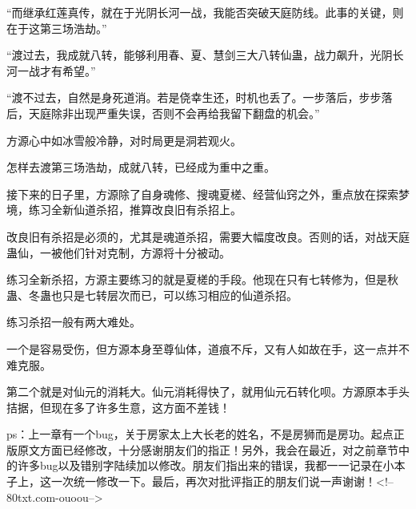 \begin{this_body}
“而继承红莲真传，就在于光阴长河一战，我能否突破天庭防线。此事的关键，则在于这第三场浩劫。”

“渡过去，我成就八转，能够利用春、夏、慧剑三大八转仙蛊，战力飙升，光阴长河一战才有希望。”

“渡不过去，自然是身死道消。若是侥幸生还，时机也丢了。一步落后，步步落后，天庭除非出现严重失误，否则不会再给我留下翻盘的机会。”

方源心中如冰雪般冷静，对时局更是洞若观火。

怎样去渡第三场浩劫，成就八转，已经成为重中之重。

接下来的日子里，方源除了自身魂修、搜魂夏槎、经营仙窍之外，重点放在探索梦境，练习全新仙道杀招，推算改良旧有杀招上。

改良旧有杀招是必须的，尤其是魂道杀招，需要大幅度改良。否则的话，对战天庭蛊仙，一被他们针对克制，方源将十分被动。

练习全新杀招，方源主要练习的就是夏槎的手段。他现在只有七转修为，但是秋蛊、冬蛊也只是七转层次而已，可以练习相应的仙道杀招。

练习杀招一般有两大难处。

一个是容易受伤，但方源本身至尊仙体，道痕不斥，又有人如故在手，这一点并不难克服。

第二个就是对仙元的消耗大。仙元消耗得快了，就用仙元石转化呗。方源原本手头拮据，但现在多了许多生意，这方面不差钱！

ps：上一章有一个bug，关于房家太上大长老的姓名，不是房狮而是房功。起点正版原文方面已经修改，十分感谢朋友们的指正！另外，我会在最近，对之前章节中的许多bug以及错别字陆续加以修改。朋友们指出来的错误，我都一一记录在小本子上，这一次统一修改一下。最后，再次对批评指正的朋友们说一声谢谢！<!--80txt.com-ouoou-->

\end{this_body}


